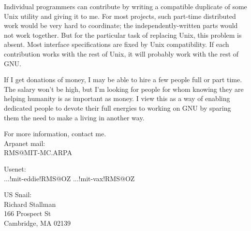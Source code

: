 \begin{quot}
Individual programmers can contribute by writing a compatible
duplicate of some Unix utility and giving it to me. For most projects,
such part-time distributed work would be very hard to coordinate; the
independently-written parts would not work together. But for the
particular task of replacing Unix, this problem is absent. Most
interface specifications are fixed by Unix compatibility. If each
contribution works with the rest of Unix, it will probably work with
the rest of GNU.

\medskip

If I get donations of money, I may be able to hire a few people full
or part time. The salary won't be high, but I'm looking for people for
whom knowing they are helping humanity is as important as money. I
view this as a way of enabling dedicated people to devote their full
energies to working on GNU by sparing them the need to make a living
in another way.

\medskip

For more information, contact me.\\
Arpanet mail:\\
  RMS@MIT-MC.ARPA

\medskip

Usenet:\\
  ...!mit-eddie!RMS@OZ \quad\quad ...!mit-vax!RMS@OZ

\medskip

US Snail:\\
  Richard Stallman\\
  166 Prospect St\\
  Cambridge, MA 02139
\end{quot}
